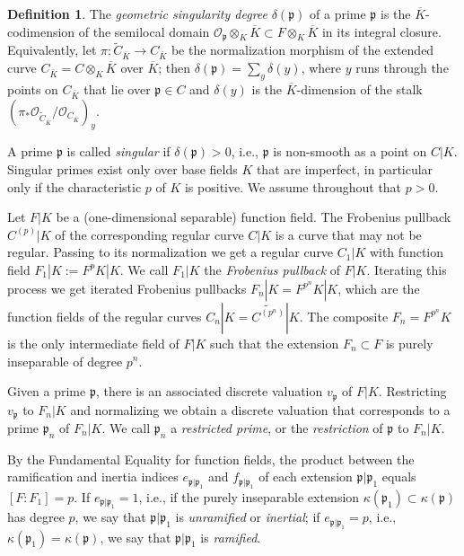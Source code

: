 \documentclass[12pt,reqno]{amsart}%
\theoremstyle{definition}
\newtheorem{defn}[prop]{Definition}
\theoremstyle{remark}
\newcommand{\su}{\subset}
\newcommand{\wt}{\widetilde}
\newcommand{\ov}{\overline}
\newcommand{\OO}{\mathcal{O}}
\newcommand{\pp}{\mathfrak{p}}
\newcommand{\de}{\delta}
\newcommand{\ka}{\kappa}
\begin{document}
\begin{defn}\label{2025_05_18_21:20}
The \emph{geometric singularity degree} $\de(\pp)$ of a prime $\pp$ is the $\ov K$-codimension of the semilocal domain $\OO_\pp\otimes_K \ov K \su F \otimes_K \ov K$ in its integral closure.
Equivalently, let $\pi :\tilde C_{\ov K} \to C_{\ov K}$ be the normalization morphism of the extended curve $C_{\ov K} = C \otimes_K \ov K$ over $\ov K$; then $\de(\pp)=\sum_y \de(y)$, where $y$ runs through the points on $C_{\ov K}$ that lie over $\pp \in C$ and $\de(y)$ is the $\ov K$-dimension of the stalk $(\pi_* \OO_{\tilde C_{\ov K}} / \OO_{C_{\ov K}})_y$.
\end{defn}

A prime $\pp$ is called \emph{singular} if $\de(\pp)>0$, i.e., $\pp$ is non-smooth as a point on $C|K$.
Singular primes exist only over base fields $K$ that are imperfect, in particular only if the characteristic $p$ of $K$ is positive.
We assume throughout that $p>0$.

Let $F|K$ be a (one-dimensional separable) function field. The Frobenius pullback $C^{(p)}|K$ of the corresponding regular curve $C|K$ is a curve that may not be regular. 
Passing to its normalization we get a regular curve $C_1|K$ with function field $F_1|K := F^p K |K$.
We call $F_1|K$ the \emph{Frobenius pullback} of $F|K$.
Iterating this process we get iterated Frobenius pullbacks $F_n|K = F^{p^n}K|K$, which are the function fields of the regular curves $C_n|K = \wt{C^{(p^n)}}|K$.
The composite $F_n=F^{p^n} K$ is the only intermediate field of $F|K$ such that the extension $F_n \su F$ is purely inseparable of degree $p^n$.

Given a prime $\pp$, there is an associated discrete valuation $v_\pp$ of $F|K$. Restricting $v_\pp$ to $F_n|K$ and normalizing we obtain a discrete valuation that corresponds to a prime $\pp_n$ of $F_n|K$. We call $\pp_n$ a \emph{restricted prime}, or the \emph{restriction} of $\pp$ to $F_n|K$.

By the Fundamental Equality for function fields, the product between the ramification and inertia indices $e_{\pp|\pp_1}$ and $f_{\pp|\pp_1}$ of each extension $\pp|\pp_1$ equals $[F:F_1]=p$.
If $e_{\pp|\pp_1}=1$, i.e., if the purely inseparable extension $\ka(\pp_1) \su \ka(\pp)$ has degree $p$, we say that $\pp|\pp_1$ is \emph{unramified} or \emph{inertial};
if $e_{\pp|\pp_1}=p$, i.e., $\ka(\pp_1) = \ka(\pp)$, we say that $\pp|\pp_1$ is \emph{ramified}.
\end{document}
